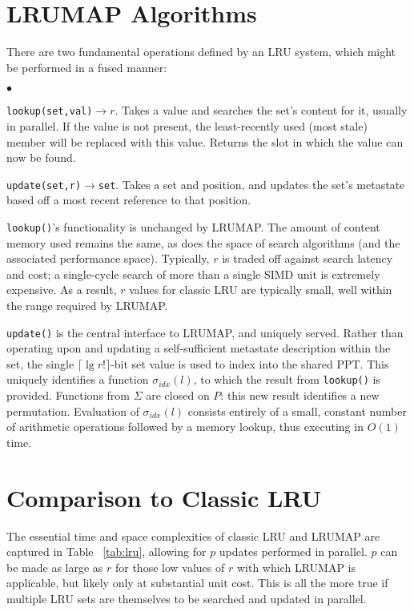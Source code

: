 \documentclass[10pt]{sigplanconf}
\newcommand{\squishlist}{\begin{list}{$\bullet$}
  {\setlength{\itemsep}{0pt}
    \setlength{\parsep}{3pt}
    \setlength{\topsep}{3pt}
    \setlength{\partopsep}{0pt}
    \setlength{\leftmargin}{1.5em}
    \setlength{\labelwidth}{1em}
    \setlength{\labelsep}{0.5em}
  } }
\newcommand{\squishend}{\end{list}}
\begin{document}
\section{LRUMAP Algorithms}
There are two fundamental operations defined by an LRU system, which might be
performed in a fused manner:
\squishlist
\item \texttt{lookup(set,val)}$\rightarrow{r}$. Takes a value and searches the
set's content for it, usually in parallel. If the value is not present, the
least-recently used (most stale) member will be replaced with this value.
Returns the slot in which the value can now be found.
\item \texttt{update(set,r)}$\rightarrow$\texttt{set}. Takes a set and
position, and updates the set's metastate based off a most recent reference to
that position.
\squishend
\texttt{lookup()}'s functionality is unchanged by LRUMAP. The amount of content
memory used remains the same, as does the space of search algorithms (and the
associated performance space). Typically, $r$ is traded off against search
latency and cost; a single-cycle search of more than a single SIMD unit is
extremely expensive. As a result, $r$ values for classic LRU are typically
small, well within the range required by LRUMAP.

\texttt{update()} is the central interface to LRUMAP, and uniquely served. Rather
than operating upon and updating a self-sufficient metastate description within
the set, the single $\lceil\lg{r!}\rceil$-bit set value is used to index into
the shared PPT. This uniquely identifies a function $\sigma_{idx}(l)$, to which
the result from \texttt{lookup()} is provided. Functions from $\Sigma$ are
closed on $P$: this new result identifies a new permutation. Evaluation of
$\sigma_{idx}(l)$ consists entirely of a small, constant number of arithmetic
operations followed by a memory lookup, thus executing in $O(1)$ time.

\section{Comparison to Classic LRU}
The essential time and space complexities of classic LRU and LRUMAP are
captured in Table ~\ref{tab:lru}, allowing for $p$ updates performed in
parallel. $p$ can be made as large as $r$ for those low values of $r$ with
which LRUMAP is applicable, but likely only at substantial unit cost. This is
all the more true if multiple LRU sets are themselves to be searched and
updated in parallel.
\end{document}
